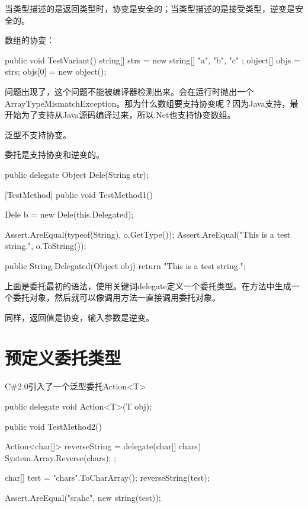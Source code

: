 当类型描述的是返回类型时，协变是安全的；当类型描述的是接受类型，逆变是安全的。

数组的协变：

\begin{CSharp}
        public void TestVariant()
        {
            string[] strs = new string[] { "a", "b", "c" };
            object[] objs = strs;
            objs[0] = new object();
        }
\end{CSharp}

问题出现了，这个问题不能被编译器检测出来。会在运行时抛出一个ArrayTypeMismatchException。那为什么数组要支持协变呢？因为Java支持，最开始为了支持从Java源码编译过来，所以.Net也支持协变数组。

泛型不支持协变。

委托是支持协变和逆变的。

\begin{CSharp}[协变和逆变]
        
        public delegate Object Dele(String str);

        [TestMethod]
        public void TestMethod1()
        {
            Dele b = new Dele(this.Delegated);

            Assert.AreEqual(typeof(String), o.GetType());
            Assert.AreEqual("This is a test string.", o.ToString());            
        }

        public String Delegated(Object obj) { return "This is a test string.";}
\end{CSharp}

上面是委托最初的语法，使用关键词delegate定义一个委托类型。在方法中生成一个委托对象，然后就可以像调用方法一直接调用委托对象。

同样，返回值是协变，输入参数是逆变。


\section{预定义委托类型}

C\#2.0引入了一个泛型委托Action<T>

\begin{CSharp}
		public delegate void Action<T>(T obj);
\end{CSharp}


\begin{CSharp}[Action和匿名方法]
        [TestMethod]
        public void TestMethod2()
        {
            Action<char[]> reverseString = delegate(char[] chars){
                System.Array.Reverse(chars);
            };

            char[] test = "chars".ToCharArray();
            reverseString(test);

            Assert.AreEqual("srahc", new string(test));

        }
\end{CSharp}

